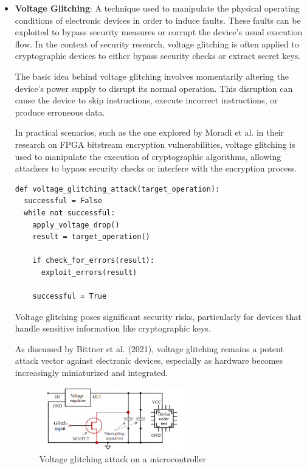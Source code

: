 \begin{itemize}
\item \textbf{Voltage Glitching}: A technique used to manipulate the physical operating conditions of electronic devices in order to induce faults. These faults can be exploited to bypass security measures or corrupt the device's usual execution flow. In the context of security research, voltage glitching is often applied to cryptographic devices to either bypass security checks or extract secret keys.

The basic idea behind voltage glitching involves momentarily altering the device's power supply to disrupt its normal operation. This disruption can cause the device to skip instructions, execute incorrect instructions, or produce erroneous data.

In practical scenarios, such as the one explored by Moradi et al.\cite{moradiVulnerabilityFPGABitstream2011} in their research on FPGA bitstream encryption vulnerabilities, voltage glitching is used to manipulate the execution of cryptographic algorithms, allowing attackers to bypass security checks or interfere with the encryption process.\\

\begin{verbatim}
def voltage_glitching_attack(target_operation):
  successful = False
  while not successful:
    apply_voltage_drop()
    result = target_operation()
    
    if check_for_errors(result):
      exploit_errors(result)

    successful = True
\end{verbatim}

Voltage glitching poses significant security risks, particularly for devices that handle sensitive information like cryptographic keys.

As discussed by Bittner et al. (2021)\cite{bittnerForgottenThreatVoltage2021}, voltage glitching remains a potent attack vector against electronic devices, especially as hardware becomes increasingly miniaturized and integrated.

\begin{figure}[H]
  \centering
  \includegraphics[width=0.6\textwidth]{images/glitch.png}
  \caption{Voltage glitching attack on a microcontroller\cite{bittnerForgottenThreatVoltage2021}}
  \label{fig:voltage_glitching}
\end{figure}


\end{itemize}
